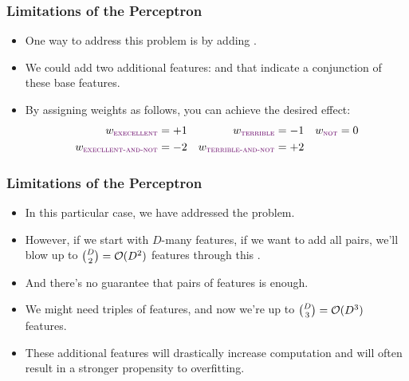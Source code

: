 \documentclass[trans]{beamer}
\begin{document}
\begin{frame}
  \frametitle{Limitations of the Perceptron}
\begin{itemize}
\item 
One way to address this problem is by adding .
  \item   We could add two additional features:
 and  that indicate
a conjunction of these base features.  
\item By assigning weights as
follows, you can achieve the desired effect:
\begin{align*}
w_{\feat{execellent}} &= +1
& w_{\feat{terrible}} &= -1
& w_{\feat{not}} &= 0 \\
w_{\feat{execllent-and-not}} &= -2 
& w_{\feat{terrible-and-not}} &= +2
\end{align*}
\end{itemize}
\end{frame}

\begin{frame}
  \frametitle{Limitations of the Perceptron}
\begin{itemize}
\item 
In this particular case, we have addressed the problem.  
\item However, if
we start with $D$-many features, if we want to add all pairs, we'll
blow up to ${D \choose 2} = \mathcal{O}(D^2)$ features through this
. 
\item  And there's no guarantee that pairs of
features is enough. 
\item We might need triples of features, and now we're
up to ${D \choose 3} = \mathcal{O}(D^3)$ features.  
\item These additional features
will drastically increase computation and will often result in a
stronger propensity to overfitting.
\end{itemize}
\end{frame}
\end{document}
